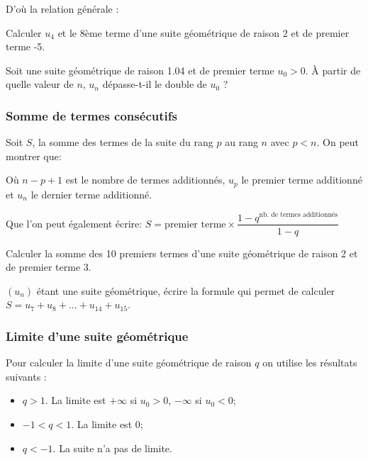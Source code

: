 \documentclass[a4paper,12pt]{scrartcl}
\begin{document}
D'où la relation générale : 


\exemple Calculer $u_4$ et le 8ème terme d'une suite géométrique de raison 2 et de premier terme -5.


Soit une suite géométrique de raison 1.04 et de premier terme $u_0 > 0$. À partir de quelle valeur de $n$, $u_n$ dépasse-t-il le double de $u_0$ ?


\subsubsection{Somme de termes consécutifs}

Soit $S$, la somme des termes de la suite du rang $p$ au rang $n$ avec $p < n$. On peut montrer que:


Où $n-p+1$ est le nombre de termes additionnés, $u_p$ le premier terme additionné et $u_n$ le dernier terme additionné.

Que l'on peut également écrire: $S = \mbox{premier terme} \times \dfrac{1-q^{\mbox{nb. de termes additionnés}}}{1-q}$

\exemple Calculer la somme des 10 premiers termes d'une suite géométrique de raison 2 et de premier terme 3.


\exemple $(u_n)$ étant une suite géométrique, écrire la formule qui permet de calculer $S = u_7 + u_8 + ... + u_{14} + u_{15}$.


\subsubsection{Limite d'une suite géométrique}

Pour calculer la limite d'une suite géométrique de raison $q$ on utilise les résultats suivants : 

\begin{itemize}
\item $q > 1$. La limite est $+\infty$ si $u_0 > 0$, $-\infty$ si $u_0 < 0$;
\item $-1 < q < 1$. La limite est 0;
\item $q < -1$. La suite n'a pas de limite.
\end{itemize}
\end{document}
